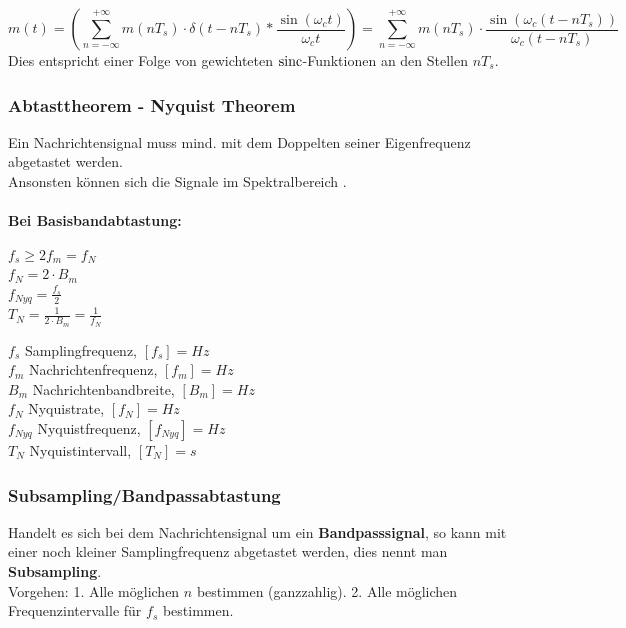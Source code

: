 \begin{equation*}
	m(t) = \left({\sum_{n=-\infty}^{+\infty}m(nT_s)\cdot\delta(t-nT_s)\ast\frac{\sin(\omega_ct)}{\omega_ct}}\right) = 
	\sum_{n=-\infty}^{+\infty}m(nT_s)\cdot\frac{\sin(\omega_c(t-nT_s))}{\omega_c(t-nT_s)}
\end{equation*}
Dies entspricht einer Folge von gewichteten $\operatorname{sinc}$-Funktionen an den Stellen $nT_s$.

\subsubsection{Abtasttheorem - Nyquist Theorem}
Ein Nachrichtensignal muss mind. mit dem Doppelten seiner Eigenfrequenz abgetastet werden. \\
Ansonsten können sich die Signale im Spektralbereich .  
\\ \\
\textbf{Bei Basisbandabtastung:}\\
\hspace*{3cm}
\begin{minipage}[t][2.0cm][c]{8cm}
	$ f_s \geq 2 f_m  = f_N$ \\
	$ f_N = 2 \cdot B_m $ \\
	$ f_{Nyq} = \frac{f_s}{2}$ \\
	$ T_N = \frac{1}{2\cdot B_m} = \frac{1}{f_N} $
\end{minipage}
\begin{minipage}[t][2.5cm][c]{10cm}
	$f_s$ Samplingfrequenz, $[f_s] = Hz$ \\
	$f_m$ Nachrichtenfrequenz, $[f_m] = Hz$ \\
	$B_m$ Nachrichtenbandbreite, $[B_m] = Hz$ \\
	$f_N$ Nyquistrate, $[f_N] = Hz$ \\
	$f_{Nyq}$ Nyquistfrequenz, $[f_{Nyq}] = Hz$ \\
	$T_N$ Nyquistintervall, $[T_N] = s$ \\	
\end{minipage}

\subsubsection{Subsampling/Bandpassabtastung}
Handelt es sich bei dem Nachrichtensignal um ein \textbf{Bandpasssignal}, so kann mit einer noch
kleiner Samplingfrequenz abgetastet werden, dies nennt man \textbf{Subsampling}. \\
Vorgehen: 1. Alle möglichen $n$ bestimmen (ganzzahlig). 2. Alle möglichen Frequenzintervalle für
$f_s$ bestimmen.

